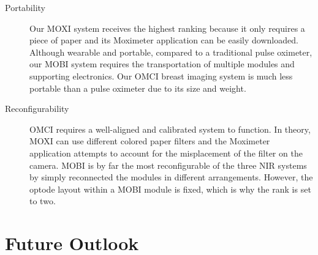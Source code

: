 \begin{description}
   \item[Portability] Our \ac{MOXI} system receives the highest ranking because it only requires a piece of paper and its Moximeter application can be easily downloaded. Although wearable and portable, compared to a traditional pulse oximeter, our \ac{MOBI} system requires the transportation of multiple modules and supporting electronics. Our \ac{OMCI} breast imaging system is much less portable than a pulse oximeter due to its size and weight.
   
   \item[Reconfigurability] \ac{OMCI} requires a well-aligned and calibrated system to function. In theory, \ac{MOXI} can use different colored paper filters and the Moximeter application attempts to account for the misplacement of the filter on the camera. \ac{MOBI} is by far the most reconfigurable of the three \ac{NIR} systems by simply reconnected the modules in different arrangements. However, the optode layout within a \ac{MOBI} module is fixed, which is why the rank is set to two. 
\end{description}


\section{Future Outlook}
